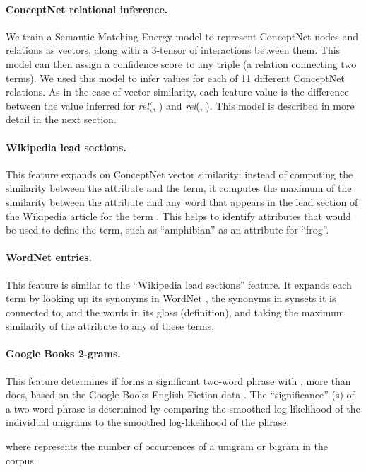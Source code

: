 \documentclass[11pt,a4paper]{article}
\begin{document}
\paragraph{ConceptNet relational inference.} We train a Semantic
Matching Energy model to represent ConceptNet nodes and relations as vectors,
along with a 3-tensor of interactions between them. This model can then assign
a confidence score to any triple (a relation connecting two terms). We used
this model to infer values for each of 11 different ConceptNet relations.  As
in the case of vector similarity, each feature value is the difference between
the value inferred for \emph{rel}(\termOne, \att) and \emph{rel}(\termTwo,
\att). This model is described in more detail in the next section.

\paragraph{Wikipedia lead sections.} This feature expands on ConceptNet vector
similarity: instead of computing the similarity between the attribute and the
term, it computes the maximum of the similarity between the attribute and any
word that appears in the lead section of the Wikipedia article for the term
\cite{wikipedia2017en}. This helps to identify attributes that would be used to
define the term, such as ``amphibian'' as an attribute for ``frog''.

\paragraph{WordNet entries.} This feature is similar to the ``Wikipedia lead
sections'' feature.  It expands each term by looking up its synonyms in WordNet
\cite{miller1998wordnet}, the synonyms in synsets it is connected to, and the
words in its gloss (definition), and taking the maximum similarity of the
attribute to any of these terms.

\paragraph{Google Books 2-grams.} This feature determines if \termOne{} forms a
significant two-word phrase with \att, more than \termTwo{} does, based on the
Google Books English Fiction data \cite{lin2012ngrams}.
The ``significance'' (s) of a two-word phrase is determined by comparing the
smoothed log-likelihood of the individual unigrams to the smoothed
log-likelihood of the phrase:

where  represents the number of occurrences of a unigram or bigram in the corpus.
\end{document}
